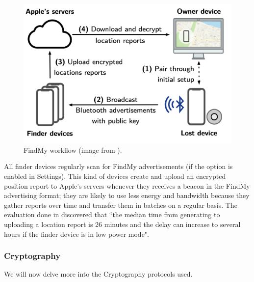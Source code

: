 \documentclass[english]{article}
\begin{document}
\begin{figure}[]
	\centering
	\includegraphics[width=.5\textwidth]{images/process.png}
	\caption{FindMy workflow (image from \cite{whocanfind}).}
	\label{process}
\end{figure}
All finder devices regularly scan for FindMy advertisements (if the option is enabled in Settings).
This kind of devices create and upload an encrypted position report to Apple's servers whenever they receives a beacon in the FindMy advertising format; they are likely to use less energy and bandwidth because they gather reports over time and transfer them in batches on a regular basis. The evaluation done in \cite{whocanfind} discovered that ``the median time from generating to uploading a location report is 26 minutes and the delay can increase to several hours if the finder device is in low power mode".

\subsubsection{Cryptography} \label{sec:crypto}
We will now delve more into the Cryptography protocols used. 
\end{document}
